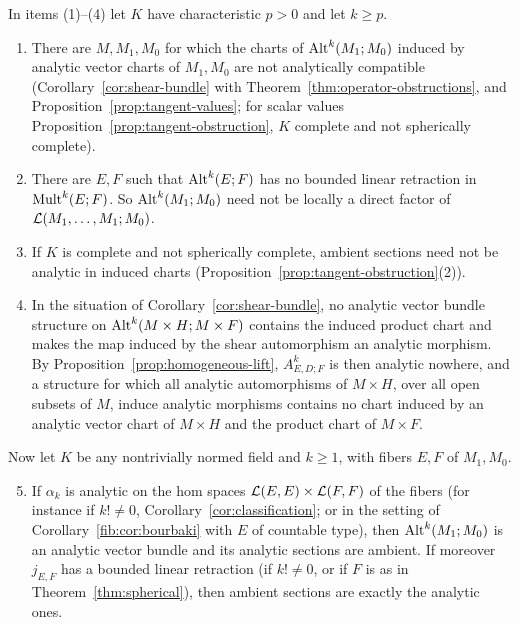 \begin{theorem}\label{amb:thm:limits}
In items \textup{(1)}--\textup{(4)} let $K$ have characteristic $p>0$ and let $k\ge p$.
\begin{enumerate}
\item There are $M,M_1,M_0$ for which the charts of $\operatorname{Alt}^k(M_1;M_0)$ induced by analytic vector charts of $M_1,M_0$ are not analytically compatible (Corollary~\ref{cor:shear-bundle} with Theorem~\ref{thm:operator-obstructions}, and Proposition~\ref{prop:tangent-values}; for scalar values Proposition~\ref{prop:tangent-obstruction}, $K$ complete and not spherically complete).
\item There are $E,F$ such that $\operatorname{Alt}^k(E;F)$ has no bounded linear retraction in $\operatorname{Mult}^k(E;F)$. So $\operatorname{Alt}^k(M_1;M_0)$ need not be locally a direct factor of $\mathcal L(M_1,\dots,M_1;M_0)$.
\item If $K$ is complete and not spherically complete, ambient sections need not be analytic in induced charts (Proposition~\ref{prop:tangent-obstruction}(2)).
\item In the situation of Corollary~\ref{cor:shear-bundle}, no analytic vector bundle structure on $\operatorname{Alt}^k(M\times H;M\times F)$ contains the induced product chart and makes the map induced by the shear automorphism an analytic morphism. By Proposition~\ref{prop:homogeneous-lift}, $A^k_{E,D;F}$ is then analytic nowhere, and a structure for which all analytic automorphisms of $M\times H$, over all open subsets of $M$, induce analytic morphisms contains no chart induced by an analytic vector chart of $M\times H$ and the product chart of $M\times F$.
\end{enumerate}
Now let $K$ be any nontrivially normed field and $k\ge1$, with fibers $E,F$ of $M_1,M_0$.
\begin{enumerate}\setcounter{enumi}{4}
\item If $\alpha_k$ is analytic on the hom spaces $\mathcal L(E,E)\times\mathcal L(F,F)$ of the fibers (for instance if $k!\ne0$, Corollary~\ref{cor:classification}; or in the setting of Corollary~\ref{fib:cor:bourbaki} with $E$ of countable type), then $\operatorname{Alt}^k(M_1;M_0)$ is an analytic vector bundle and its analytic sections are ambient. If moreover $j_{E,F}$ has a bounded linear retraction (if $k!\ne0$, or if $F$ is as in Theorem~\ref{thm:spherical}), then ambient sections are exactly the analytic ones.
\end{enumerate}
\end{theorem}

